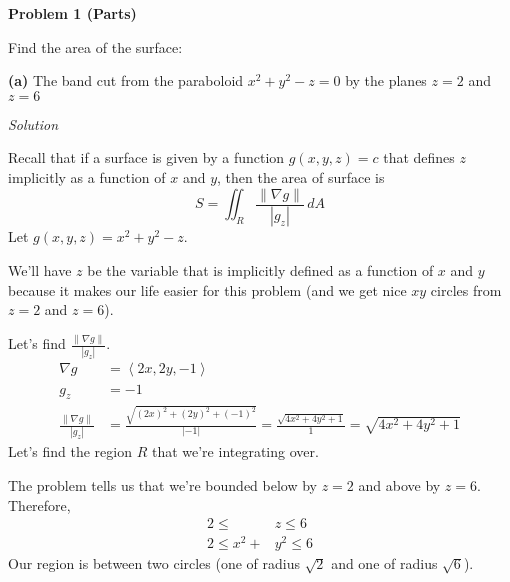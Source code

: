 \documentclass{article}
\newcommand{\lra}[1]{\left\langle #1 \right\rangle}
\newcommand{\norm}[1]{\left\lVert #1 \right\rVert}
\newcommand{\Solution}{\textit{Solution}}
\begin{document}
{}\textbf{Problem 1 (Parts)}

Find the area of the surface:

{}\textbf{(a)} The band cut  from the paraboloid $x^2+y^2-z=0$ by the planes $z=2$ and $z=6$

\Solution

Recall that if a surface is given by a function $g(x,y,z)=c$ that defines $z$ implicitly as a function of $x$ and $y$, then the area of surface is
\begin{equation*}
    S=\iint_R \frac{\norm{\nabla g}}{\left| g_z\right|}\,dA
\end{equation*}
Let $g(x,y,z)=x^2+y^2-z$.

We'll have $z$ be the variable that is implicitly defined as a function of $x$ and $y$ because it makes our life easier for this problem (and we get nice $xy$ circles from $z=2$ and $z=6$).

Let's find $\displaystyle\frac{\norm{\nabla g}}{\left| g_z\right|} $.
\begin{align*}
    \nabla g&=\lra{2x,2y,-1}\\
    g_z &= -1\\
    \frac{\norm{\nabla g}}{\left| g_z\right|}&=\frac{\sqrt{(2x)^2+(2y)^2+(-1)^2}}{\left|-1\right|}=\frac{\sqrt{4x^2+4y^2+1}}{1}=\sqrt{4x^2+4y^2+1}
\end{align*}
Let's find the region $R$ that we're integrating over.

The problem tells us that we're bounded below by $z=2$ and above by $z=6$. Therefore,
\begin{align*}
    2\leq &z\leq 6\\
    2\leq x^2+&y^2 \leq 6\tag{$x^2+y^2-z=0\implies z=x^2+y^2$}
\end{align*}
Our region is between two circles (one of radius $\sqrt{2}$ and one of radius $\sqrt{6}$).
\end{document}

